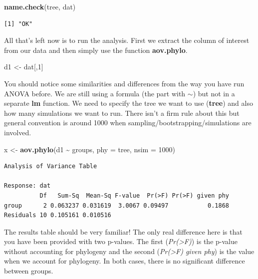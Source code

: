 \documentclass[
]{book}
\newenvironment{Shaded}{\begin{snugshade}}{\end{snugshade}}
\newcommand{\DataTypeTok}[1]{\textcolor[rgb]{0.13,0.29,0.53}{#1}}
\newcommand{\DecValTok}[1]{\textcolor[rgb]{0.00,0.00,0.81}{#1}}
\newcommand{\KeywordTok}[1]{\textcolor[rgb]{0.13,0.29,0.53}{\textbf{#1}}}
\newcommand{\NormalTok}[1]{#1}
\newcommand{\OperatorTok}[1]{\textcolor[rgb]{0.81,0.36,0.00}{\textbf{#1}}}
\newcommand{\StringTok}[1]{\textcolor[rgb]{0.31,0.60,0.02}{#1}}
\begin{document}
\begin{Shaded}
\begin{Highlighting}[]
\KeywordTok{name.check}\NormalTok{(tree, dat)}
\end{Highlighting}
\end{Shaded}

\begin{verbatim}
[1] "OK"
\end{verbatim}

All that's left now is to run the analysis. First we extract the column of interest from our data and then simply use the function \textbf{aov.phylo}.

\begin{Shaded}
\begin{Highlighting}[]
\NormalTok{d1 \textless{}{-}}\StringTok{ }\NormalTok{dat[,}\DecValTok{1}\NormalTok{]}
\end{Highlighting}
\end{Shaded}

You should notice some similarities and differences from the way you have run ANOVA before. We are still using a formula (the part with \(\sim\)) but not in a separate \textbf{lm} function. We need to specify the tree we want to use (\textbf{tree}) and also how many simulations we want to run. There isn't a firm rule about this but general convention is around 1000 when sampling/bootstrapping/simulations are involved.

\begin{Shaded}
\begin{Highlighting}[]
\NormalTok{x \textless{}{-}}\StringTok{ }\KeywordTok{aov.phylo}\NormalTok{(d1 }\OperatorTok{\textasciitilde{}}\StringTok{ }\NormalTok{groups, }\DataTypeTok{phy =}\NormalTok{ tree, }\DataTypeTok{nsim =} \DecValTok{1000}\NormalTok{)}
\end{Highlighting}
\end{Shaded}

\begin{verbatim}
Analysis of Variance Table

Response: dat
          Df   Sum-Sq  Mean-Sq F-value  Pr(>F) Pr(>F) given phy
group      2 0.063237 0.031619  3.0067 0.09497           0.1868
Residuals 10 0.105161 0.010516                                 
\end{verbatim}

The results table should be very familiar! The only real difference here is that you have been provided with two p-values. The first (\emph{Pr(\textgreater F)}) is the p-value without accounting for phylogeny and the second (\emph{Pr(\textgreater F) given phy}) is the value when we account for phylogeny. In both cases, there is no significant difference between groups.
\end{document}
